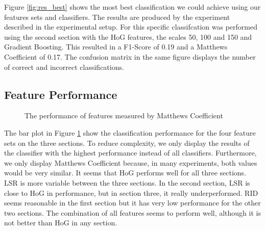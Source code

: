 Figure \ref{fig:res_best} shows the most best classification we could achieve using our features sets and classifiers. The results are produced by the experiment described in the experimental setup. For this specific classifcation was performed using the second section with the HoG features, the scales 50, 100 and 150 and Gradient Boosting. This resulted in a F1-Score of 0.19 and a Matthews Coefficient of 0.17. The confusion matrix in the same figure displays the number of correct and incorrect classifications. 

\subsection{Feature Performance}

\datazero

\begin{figure}
	\caption{The performance of features measured by Matthews Coefficient}
	\label{fig:res_bar_0}
\end{figure}

The bar plot in Figure \ref{fig:res_bar_0} show the classification performance for the four feature sets on the three sections. To reduce complexity, we only display the results of the classifier with the highest performance instead of all classifiers. Furthermore, we only display Matthews Coefficient because, in many experiments, both values would be very similar.
It seems that HoG performs well for all three sections. LSR is more variable between the three sections. In the second section, LSR is close to HoG in performance, but in section three, it really underperformed. RID seems reasonable in the first section but it has very low performance for the other two sections. The combination of all features seems to perform well, although it is not better than HoG in any section.

